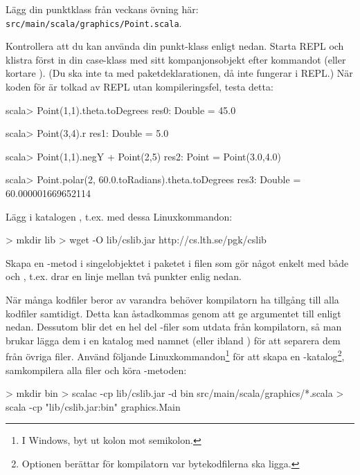 \Task Lägg din punktklass från veckans övning här:\\ \texttt{src/main/scala/graphics/Point.scala}.

Kontrollera att du kan använda din punkt-klass enligt nedan. Starta REPL och klistra först in din case-klass med sitt kompanjonsobjekt efter kommandot  (eller kortare ). (Du ska inte ta med paketdeklarationen, då  inte fungerar i REPL.) När koden för  är tolkad av REPL utan kompileringsfel, testa detta:
\begin{REPLnonum}
scala> Point(1,1).theta.toDegrees
res0: Double = 45.0

scala> Point(3,4).r
res1: Double = 5.0

scala> Point(1,1).negY + Point(2,5)
res2: Point = Point(3.0,4.0)

scala> Point.polar(2, 60.0.toRadians).theta.toDegrees
res3: Double = 60.000001669652114
\end{REPLnonum}


\Task Lägg  i katalogen , t.ex. med dessa Linuxkommandon:
\begin{REPLnonum}
> mkdir lib
> wget -O lib/cslib.jar http://cs.lth.se/pgk/cslib
\end{REPLnonum}

\Task Skapa en -metod i singelobjektet  i paketet  i filen 
som gör något enkelt med både  och , t.ex. drar en linje mellan två punkter enlig nedan.

\noindent När många kodfiler beror av varandra behöver kompilatorn ha tillgång till alla kodfiler samtidigt.  Detta kan åstadkommas genom att ge argumentet  till  enligt nedan. Dessutom blir det en hel del -filer som utdata från kompilatorn, så man brukar lägga dem i en katalog med namnet  (eller ibland ) för att separera dem från övriga filer.
Använd följande Linuxkommandon\footnote{I Windows, byt ut kolon mot semikolon.} för att skapa en -katalog\footnote{Optionen  berättar för kompilatorn var bytekodfilerna ska ligga.}, samkompilera alla filer och köra -metoden:
\begin{REPLnonum}
> mkdir bin
> scalac -cp lib/cslib.jar -d bin src/main/scala/graphics/*.scala
> scala -cp "lib/cslib.jar:bin" graphics.Main
\end{REPLnonum}


